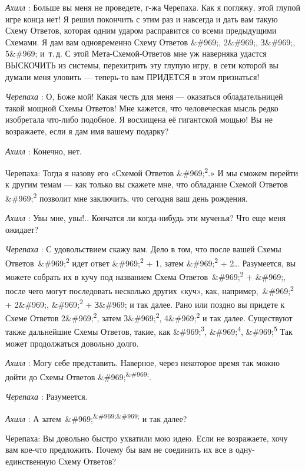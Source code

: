 \documentclass[../main.tex]{subfiles}
\begin{document}
\begin{dialogue}
\emph{Ахилл} : Больше вы меня не проведете, г-жа Черепаха. Как я погляжу, этой глупой игре конца нет! Я решил покончить с этим раз и навсегда и дать вам такую Схему Ответов, которая одним ударом расправится со всеми предыдущими Схемами. Я дам вам одновременно Схему Ответов \&\#969;, 2\&\#969;, З\&\#969;, 5\&\#969; и~т.\,д. С этой Мета-Схемой-Ответов мне уж наверняка удастся ВЫСКОЧИТЬ из системы, перехитрить эту глупую игру, в сети которой вы думали меня уловить --- теперь-то вам ПРИДЕТСЯ в этом признаться!

\emph{Черепаха} : О, Боже мой! Какая честь для меня --- оказаться обладательницей такой мощной Схемы Ответов! Мне кажется, что человеческая мысль редко изобретала что-либо подобное. Я восхищена её гигантской мощью! Вы не возражаете, если я дам имя вашему подарку?

\emph{Ахилл} : Конечно, нет.

Черепаха: Тогда я назову его «Схемой Ответов \&\#969;\textsuperscript{2}.» И мы сможем перейти к другим темам --- как только вы скажете мне, что обладание Схемой Ответов \&\#969;\textsuperscript{2} позволит мне заключить, что сегодня ваш день рождения.

\emph{Ахилл} : Увы мне, увы!.. Кончатся ли когда-нибудь эти мученья? Что еще меня ожидает?

\emph{Черепаха} : С удовольствием скажу вам. Дело в том, что после вашей Схемы Ответов~\&\#969;\textsuperscript{2} идет ответ \&\#969;\textsuperscript{2} + 1, затем \&\#969;\textsuperscript{2} + 2\ldots{} Разумеется, вы можете собрать их в кучу под названием Схема Ответов~\&\#969;\textsuperscript{2} + \&\#969;, после чего могут последовать несколько других «куч», как, например,~\&\#969;\textsuperscript{2} + 2\&\#969;, \&\#969;\textsuperscript{2} + З\&\#969; и так далее. Рано или поздно вы придете к Схеме Ответов 2\&\#969;\textsuperscript{2}, затем З\&\#969;\textsuperscript{2}, 4\&\#969;\textsuperscript{2} и так далее. Существуют также дальнейшие Схемы Ответов, такие, как \&\#969;\textsuperscript{3}, \&\#969;\textsuperscript{4}, \&\#969;\textsuperscript{5} Так может продолжаться довольно долго.

\emph{Ахилл} : Могу себе представить. Наверное, через некоторое время так можно дойти до Схемы Ответов \&\#969;\textsuperscript{\&\#969;}.

\emph{Черепаха} : Разумеется.

\emph{Ахилл} : А затем~\&\#969;\textsuperscript{\&\#969;\&\#969;} и так далее?

Черепаха: Вы довольно быстро ухватили мою идею. Если не возражаете, хочу вам кое-что предложить. Почему бы вам не соединить их все в одну-единственную Схему Ответов?


\end{dialogue}
\end{document}
